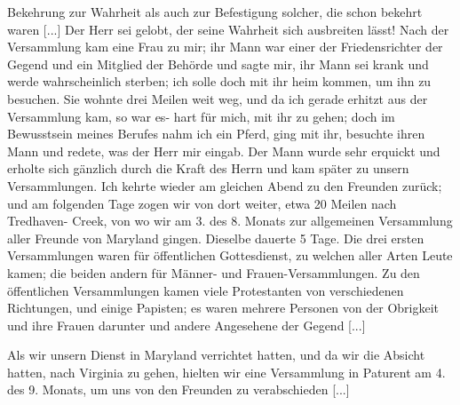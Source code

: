 Bekehrung zur Wahrheit als auch zur Befestigung solcher, die
schon bekehrt waren [...] Der Herr sei gelobt, der seine 
Wahrheit sich ausbreiten lässt! Nach der Versammlung kam eine Frau
zu mir; ihr Mann war einer der Friedensrichter der Gegend
und ein Mitglied der Behörde und sagte mir, ihr Mann
sei krank und werde wahrscheinlich sterben; ich solle doch mit ihr
heim kommen, um ihn zu besuchen. Sie wohnte drei Meilen weit
weg, und da ich gerade erhitzt aus der Versammlung kam, so war
es- hart für mich, mit ihr zu gehen; doch im Bewusstsein meines
Berufes nahm ich ein Pferd, ging mit ihr, besuchte ihren Mann
und redete, was der Herr mir eingab. Der Mann wurde sehr
erquickt und erholte sich gänzlich durch die Kraft des Herrn und
kam später zu unsern Versammlungen. Ich kehrte wieder am
gleichen Abend zu den Freunden zurück; und am folgenden Tage
zogen wir von dort weiter, etwa 20 Meilen nach Tredhaven-
Creek, von wo wir am 3. des 8. Monats 
zur allgemeinen Versammlung aller Freunde von Maryland gingen. Dieselbe dauerte
5 Tage. Die drei ersten Versammlungen waren für öffentlichen
Gottesdienst, zu welchen 
aller Arten Leute kamen; die beiden
andern für Männer- und Frauen-Versammlungen. Zu den öffentlichen 
Versammlungen kamen viele Protestanten von verschiedenen
Richtungen, und einige Papisten; es waren mehrere Personen
von der Obrigkeit und ihre Frauen darunter und andere Angesehene 
der Gegend [...] 

Als wir unsern Dienst in Maryland verrichtet hatten, und
da wir die Absicht hatten, nach Virginia zu gehen, hielten wir
eine Versammlung in Paturent am 4. des 9. Monats, um uns
von den Freunden zu verabschieden [...]

